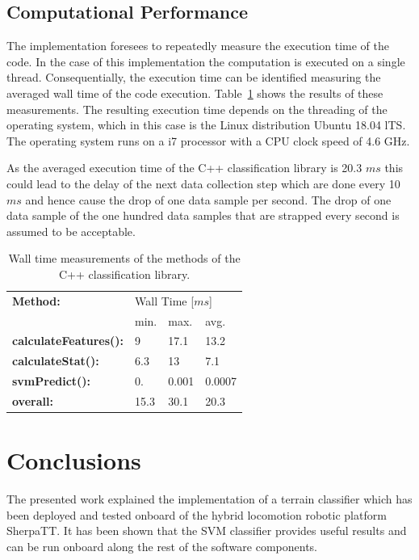 \documentclass{article}
\begin{document}
\subsection{Computational Performance}
The implementation foresees to repeatedly measure the execution time of the code. In the case of this implementation the computation is executed on a single thread. Consequentially, the execution time can be identified measuring the averaged wall time of the code execution. Table~\ref{table:compmeasurments} shows the results of these measurements. The resulting execution time depends on the threading of the operating system, which in this case is the Linux distribution Ubuntu 18.04 lTS. The operating system runs on a i7 processor with a CPU clock speed of 4.6 GHz. 

As the averaged execution time of the C++ classification library is 20.3 $ms$ this could lead to the delay of the next data collection step which are done every 10 $ms$ and hence cause the drop of one data sample per second. The drop of one data sample of the one hundred data samples that are strapped every second is assumed to be acceptable.

\begin{table}[htb!]
   \centering
    \caption{Wall time measurements of the methods of the C++ classification library.}
    \begin{tabularx}{\columnwidth}{X|XXX}
        \textbf{Method:} & \multicolumn{3}{X}{Wall Time [$ms$]} \\
        &min.&max.&avg.\\
        \hline
        \hline
        \textbf{calculateFeatures():} & 9&  17.1& 13.2 \\
        \textbf{calculateStat():}     & 6.3 & 13 & 7.1 \\
        \textbf{svmPredict():}        &  0. &  0.001 & 0.0007  \\
        \hline
        \textbf{overall:}             & 15.3 & 30.1 &20.3  \\
    \end{tabularx}	
    \label{table:compmeasurments}
\end{table}


\section{Conclusions}

The presented work explained the implementation of a terrain classifier which has been deployed and tested onboard of the hybrid locomotion robotic platform SherpaTT.
It has been shown that the SVM classifier provides useful results and can be run onboard along the rest of the software components.
\end{document}
